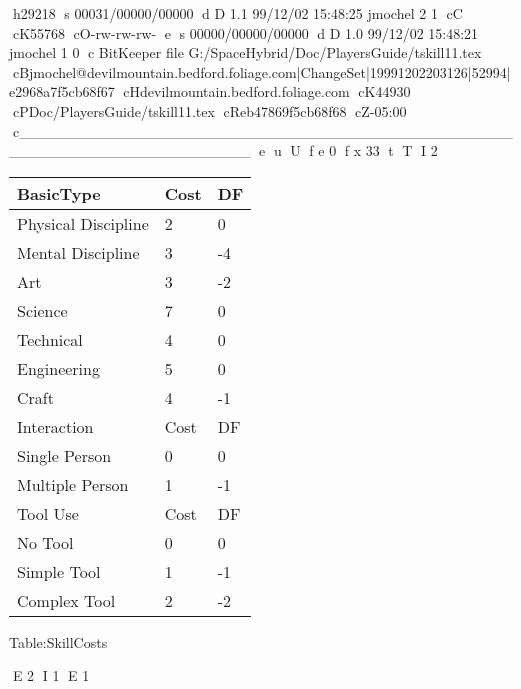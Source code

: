 h29218
s 00031/00000/00000
d D 1.1 99/12/02 15:48:25 jmochel 2 1
cC
cK55768
cO-rw-rw-rw-
e
s 00000/00000/00000
d D 1.0 99/12/02 15:48:21 jmochel 1 0
c BitKeeper file G:/SpaceHybrid/Doc/PlayersGuide/tskill11.tex
cBjmochel@devilmountain.bedford.foliage.com|ChangeSet|19991202203126|52994|e2968a7f5cb68f67
cHdevilmountain.bedford.foliage.com
cK44930
cPDoc/PlayersGuide/tskill11.tex
cReb47869f5cb68f68
cZ-05:00
c______________________________________________________________________
e
u
U
f e 0
f x 33
t
T
I 2

\begin{SHTable}[h]
	\begin{tabular}{lll}
    BasicType           & Cost          & DF \\
	\hline
    Physical Discipline            &  2          &  0 \\
    Mental Discipline              &  3           & -4 \\
    Art                            &  3           & -2 \\
    Science                        &  7          &  0 \\
    Technical                      &  4          &  0 \\
    Engineering                    &  5          &  0 \\
    Craft                          &  4           & -1 \\
	\hline
    Interaction                    & Cost          & DF \\
	\hline
    Single Person                  &  0          &  0 \\
    Multiple Person                &  1           & -1 \\
	\hline
    Tool Use                       & Cost          & DF \\
	\hline
    No Tool                        &  0          &  0 \\
    Simple Tool                    &  1           & -1 \\
    Complex Tool                   &  2           & -2 \\
    \end{tabular}
    \caption{Table:SkillCosts}
\end{SHTable}



E 2
I 1
E 1

